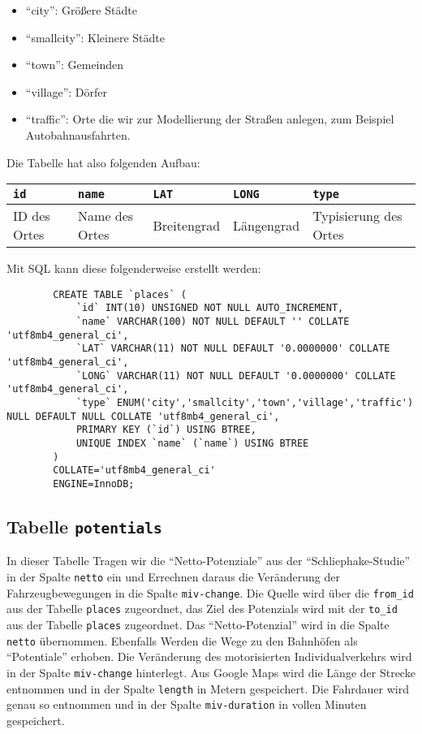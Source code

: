 \documentclass[fontsize=12pt,a4paper]{scrreprt}
\begin{document}
\begin{itemize}
    \item \enquote{city}: Größere Städte
    \item \enquote{smallcity}: Kleinere Städte
    \item \enquote{town}: Gemeinden
    \item \enquote{village}: Dörfer
    \item \enquote{traffic}: Orte die wir zur Modellierung der Straßen anlegen, zum Beispiel Autobahnausfahrten.
\end{itemize}

Die Tabelle hat also folgenden Aufbau:

\begin{table}[htbp]
    \begin{tabular}{|l|l|l|l|l|}\hline
        \texttt{id} & \texttt{name} & \texttt{LAT} & \texttt{LONG} & \texttt{type}\\\hline
        ID des Ortes & Name des Ortes & Breitengrad & Längengrad & Typisierung des Ortes \\ \hline
    \end{tabular}
\end{table}

Mit SQL kann diese folgenderweise erstellt werden:
\begingroup
    \begin{verbatim}
        CREATE TABLE `places` (
            `id` INT(10) UNSIGNED NOT NULL AUTO_INCREMENT,
            `name` VARCHAR(100) NOT NULL DEFAULT '' COLLATE 'utf8mb4_general_ci',
            `LAT` VARCHAR(11) NOT NULL DEFAULT '0.0000000' COLLATE 'utf8mb4_general_ci',
            `LONG` VARCHAR(11) NOT NULL DEFAULT '0.0000000' COLLATE 'utf8mb4_general_ci',
            `type` ENUM('city','smallcity','town','village','traffic') NULL DEFAULT NULL COLLATE 'utf8mb4_general_ci',
            PRIMARY KEY (`id`) USING BTREE,
            UNIQUE INDEX `name` (`name`) USING BTREE
        )
        COLLATE='utf8mb4_general_ci'
        ENGINE=InnoDB;
    \end{verbatim}
\endgroup

\subsection{Tabelle \texttt{potentials}}

In dieser Tabelle Tragen wir die \enquote{Netto-Potenziale} aus der \enquote{Schliephake-Studie} in der Spalte \texttt{netto} ein und Errechnen daraus die Veränderung der Fahrzeugbewegungen in die Spalte \texttt{miv-change}. Die Quelle wird über die \texttt{from_id} aus der Tabelle \texttt{places} zugeordnet, das Ziel des Potenzials wird mit der \texttt{to_id} aus der Tabelle \texttt{places} zugeordnet. Das \enquote{Netto-Potenzial} wird in die Spalte \texttt{netto} übernommen. Ebenfalls Werden die Wege zu den Bahnhöfen als \enquote{Potentiale} erhoben. Die Veränderung des motorisierten Individualverkehrs wird in der Spalte \texttt{miv-change} hinterlegt. Aus Google Maps wird die Länge der Strecke entnommen und in der Spalte \texttt{length} in Metern gespeichert. Die Fahrdauer wird genau so entnommen und in der Spalte \texttt{miv-duration} in vollen Minuten gespeichert.
\end{document}
